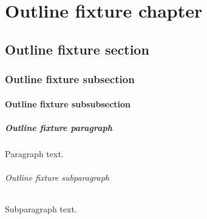 \chapter{Outline fixture chapter}
\section{Outline fixture section}\label{sec:fixture:outline}
\subsection*{Outline fixture subsection}
\subsubsection{Outline fixture subsubsection}
\paragraph*{Outline fixture paragraph}
Paragraph text.

\subparagraph{Outline fixture subparagraph}
Subparagraph text.
